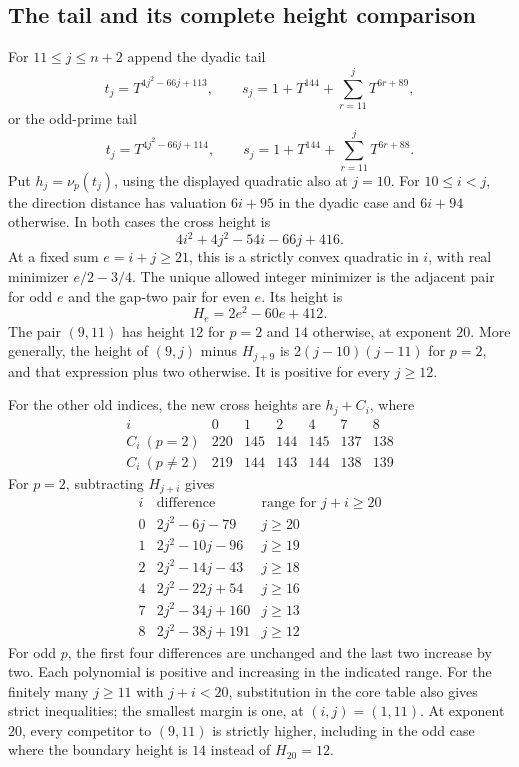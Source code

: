\documentclass[11pt]{article}
\theoremstyle{remark}\newtheorem{remark}[theorem]{Remark}
\newcommand{\val}{\nu}
\begin{document}
\subsection{The tail and its complete height comparison}

For $11\leq j\leq n+2$ append the dyadic tail
\[
 t_j=T^{4j^2-66j+113},\qquad
 s_j=1+T^{144}+\sum_{r=11}^jT^{6r+89},
\]
or the odd-prime tail
\[
 t_j=T^{4j^2-66j+114},\qquad
 s_j=1+T^{144}+\sum_{r=11}^jT^{6r+88}.
\]
Put $h_j=\val_p(t_j)$, using the displayed quadratic also at $j=10$.
For $10\le i<j$, the direction distance has valuation $6i+95$ in the
dyadic case and $6i+94$ otherwise. In both cases the cross height is
\[
 4i^2+4j^2-54i-66j+416.
\]
At a fixed sum $e=i+j\ge21$, this is a strictly convex quadratic
in $i$, with real minimizer $e/2-3/4$. The unique allowed integer
minimizer is the adjacent pair for odd $e$ and the gap-two pair for
even $e$. Its height is
\begin{equation}\label{eq:family-tail-height}
 H_e=2e^2-60e+412.
\end{equation}
The pair $(9,11)$ has height $12$ for $p=2$ and $14$ otherwise, at
exponent $20$. More generally, the height of $(9,j)$ minus $H_{j+9}$
is $2(j-10)(j-11)$ for $p=2$, and that expression plus two otherwise.
It is positive for every $j\ge12$.

For the other old indices, the new cross heights are $h_j+C_i$, where
\[
\begin{array}{c|rrrrrr}
i&0&1&2&4&7&8\\ \hline
C_i\ (p=2)&220&145&144&145&137&138\\
C_i\ (p\ne2)&219&144&143&144&138&139
\end{array}
\]
For $p=2$, subtracting $H_{j+i}$ gives
\[
\begin{array}{c|l|c}
i&\text{difference}&\text{range for }j+i\ge20\\ \hline
0&2j^2-6j-79&j\ge20\\
1&2j^2-10j-96&j\ge19\\
2&2j^2-14j-43&j\ge18\\
4&2j^2-22j+54&j\ge16\\
7&2j^2-34j+160&j\ge13\\
8&2j^2-38j+191&j\ge12
\end{array}
\]
For odd $p$, the first four differences are unchanged and the last
two increase by two. Each polynomial is positive and increasing in
the indicated range. For the finitely many $j\ge11$ with $j+i<20$,
substitution in the core table also gives strict inequalities; the
smallest margin is one, at $(i,j)=(1,11)$. At exponent $20$, every
competitor to $(9,11)$ is strictly higher, including in the odd case
where the boundary height is $14$ instead of $H_{20}=12$.
\end{document}
